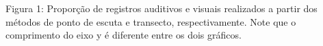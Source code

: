 Figura 1: Proporção de registros auditivos e visuais realizados a partir dos métodos de ponto de escuta e transecto, respectivamente. Note que o comprimento do eixo y é diferente entre os dois gráficos.